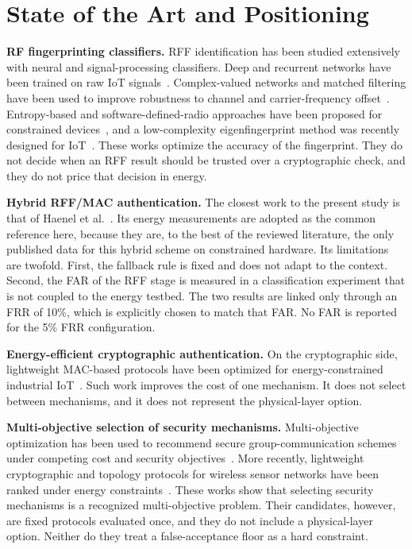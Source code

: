 \documentclass[conference]{IEEEtran}
\begin{document}
\section{State of the Art and Positioning}
\label{sec:related}

\textbf{RF fingerprinting classifiers.} RFF identification has been studied extensively with neural and signal-processing classifiers. Deep and recurrent networks have been trained on raw IoT signals~\cite{das2018deep,merchant2019enhanced}. Complex-valued networks and matched filtering have been used to improve robustness to channel and carrier-frequency offset~\cite{gopalakrishnan2019robust,wilson2019integration}. Entropy-based and software-defined-radio approaches have been proposed for constrained devices~\cite{baldini2017physical,nouichi2019iot}, and a low-complexity eigenfingerprint method was recently designed for IoT~\cite{morge2022rf}. These works optimize the accuracy of the fingerprint. They do not decide when an RFF result should be trusted over a cryptographic check, and they do not price that decision in energy.

\textbf{Hybrid RFF/MAC authentication.} The closest work to the present study is that of Haenel et al.~\cite{haenel2021practical}. Its energy measurements are adopted as the common reference here, because they are, to the best of the reviewed literature, the only published data for this hybrid scheme on constrained hardware. Its limitations are twofold. First, the fallback rule is fixed and does not adapt to the context. Second, the FAR of the RFF stage is measured in a classification experiment that is not coupled to the energy testbed. The two results are linked only through an FRR of 10\%, which is explicitly chosen to match that FAR. No FAR is reported for the 5\% FRR configuration.

\textbf{Energy-efficient cryptographic authentication.} On the cryptographic side, lightweight MAC-based protocols have been optimized for energy-constrained industrial IoT~\cite{li2018robust}. Such work improves the cost of one mechanism. It does not select between mechanisms, and it does not represent the physical-layer option.

\textbf{Multi-objective selection of security mechanisms.} Multi-objective optimization has been used to recommend secure group-communication schemes under competing cost and security objectives~\cite{prantl2023recommendation}. More recently, lightweight cryptographic and topology protocols for wireless sensor networks have been ranked under energy constraints~\cite{prvulovic2025hermees}. These works show that selecting security mechanisms is a recognized multi-objective problem. Their candidates, however, are fixed protocols evaluated once, and they do not include a physical-layer option. Neither do they treat a false-acceptance floor as a hard constraint.
\end{document}
